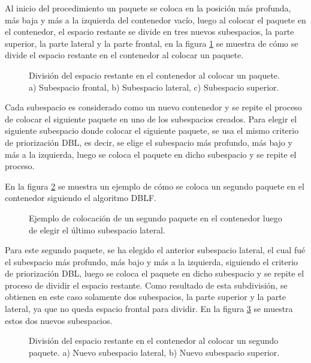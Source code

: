 Al inicio del procedimiento un paquete se coloca en la posición más profunda, más baja y más a la izquierda del contenedor vacío, luego al colocar el paquete en el contenedor, el espacio restante se divide en tres nuevos subespacios, la parte superior, la parte lateral y la parte frontal, en la figura \ref{fig:subespacios} se muestra de cómo se divide el espacio restante en el contenedor al colocar un paquete.

\begin{figure}[H]
    \centering
    
    \caption{División del espacio restante en el contenedor al colocar un paquete. a) Subespacio frontal, b) Subespacio lateral, c) Subespacio superior.}
    \label{fig:subespacios}
\end{figure}

Cada subespacio es considerado como un nuevo contenedor y se repite el proceso de colocar el siguiente paquete en uno de los subespacios creados. Para elegir el siguiente subespacio donde colocar el siguiente paquete, se usa el mismo criterio de priorización DBL, es decir, se elige el subespacio más profundo, más bajo y más a la izquierda, luego se coloca el paquete en dicho subespacio y se repite el proceso.

En la figura \ref{fig:segundo_paquete} se muestra un ejemplo de cómo se coloca un segundo paquete en el contenedor siguiendo el algoritmo DBLF.

\begin{figure}[H]
    \centering
    
    \caption{Ejemplo de colocación de un segundo paquete en el contenedor luego de elegir el último subespacio lateral.}
    \label{fig:segundo_paquete}
\end{figure}

Para este segundo paquete, se ha elegido el anterior subespacio lateral, el cual fué el subespacio más profundo, más bajo y más a la izquierda, siguiendo el criterio de priorización DBL, luego se coloca el paquete en dicho subespacio y se repite el proceso de dividir el espacio restante. Como resultado de esta subdivisión, se obtienen en este caso solamente dos subespacios, la parte superior y la parte lateral, ya que no queda espacio frontal para dividir. En la figura \ref{fig:segundos_subespacios} se muestra estos dos nuevos subespacios.

\begin{figure}[H]
    \centering
    
    \caption{División del espacio restante en el contenedor al colocar un segundo paquete. a) Nuevo subespacio lateral, b) Nuevo subespacio superior.}
    \label{fig:segundos_subespacios}
\end{figure}

